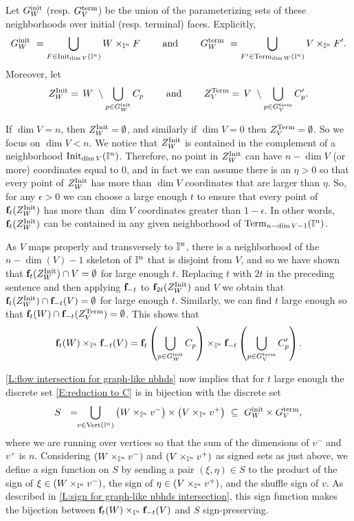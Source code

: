 Let $G^{\mathrm{init}}_W$ (resp. $G^{\mathrm{term}}_V$) be the union of the parameterizing sets of these neighborhoods over initial (resp. terminal) faces.
Explicitly,
\[
G^{\mathrm{init}}_W\ =
\bigcup_{F \in {\rm Init}_{\dim V}(\mathbb{I}^n)} W \times_{\mathbb{I}^n} F
\qquad \text{ and } \qquad
G^{\mathrm{term}}_W\ =
\bigcup_{F^\prime \in {\rm Term}_{\dim W}(\mathbb{I}^n)} V \times_{\mathbb{I}^n} F^\prime.
\]
Moreover, let
\[
Z_W^{\rm Init} =\, W\ \setminus \bigcup_{p \in G^{\mathrm{init}}_W} C_p
\qquad \text{ and } \qquad
Z_V^{\rm Term} =\, V\ \setminus \bigcup_{p \in G^{\mathrm{term}}_V} C_p^\prime.
\]

If $\dim V=n$, then $Z_W^{\rm Init}=\emptyset$, and similarly if $\dim V=0$ then $Z_V^{\rm Term}=\emptyset$.
So we focus on $\dim V<n$.
We notice that $Z_W^{\rm Init}$ is contained in the complement of a neighborhood ${\rm Init}_{\dim V}(\mathbb{I}^n)$.
Therefore, no point in $Z_W^{\rm Init}$ can have $n-\dim V$ (or more) coordinates equal to $0$, and in fact we can assume there is an $\eta>0$
so that every point of $Z_W^{\rm Init}$ has more than $\dim V$ coordinates that are larger than $\eta$.
So, for any $\epsilon>0$ we can choose a large enough $t$ to ensure that every point of $\mathbf{f}_t(Z_W^{\rm Init})$ has more than $\dim V$ coordinates greater than
$1-\epsilon$.
In other words, $\mathbf{f}_t(Z_W^{\rm Init})$ can be contained in any given neighborhood of ${\rm Term}_{n-\dim V-1}(\mathbb{I}^n)$.

As $V$ maps properly and transversely to $\mathbb{I}^n$, there is a neighborhood of the $n-\dim(V)-1$ skeleton of $\mathbb{I}^n$ that is disjoint from $V$, and so we have shown that $\mathbf{f}_t(Z_W^{\rm Init}) \cap V = \emptyset$ for large enough $t$.
Replacing $t$ with $2t$ in the preceding sentence and then applying $\mathbf{f}_{-t}$ to $\mathbf{f}_{2t}(Z_W^{\rm Init})$ and $V$ we obtain that $\mathbf{f}_t(Z_W^{\rm Init}) \cap \mathbf{f}_{-t}(V) = \emptyset$ for large enough $t$.
Similarly, we can find $t$ large enough so that $\mathbf{f}_{t}(W) \cap \mathbf{f}_{-t}(Z_V^{\rm Term}) = \emptyset$.
This shows that
\begin{equation}\label{E:reduction to C}
	\mathbf{f}_t(W) \times_{\mathbb{I}^n} \mathbf{f}_{-t}(V) = \mathbf{f}_t \left( \bigcup_{p \in G^{\mathrm{init}}_W} C_p \right) \times_{\mathbb{I}^n} \mathbf{f}_{-t} \left( \bigcup_{p \in G^{\mathrm{term}}_V} C_p^\prime \right).
\end{equation}

\cref{L:flow intersection for graph-like nbhds} now implies that for $t$ large enough the discrete set \eqref{E:reduction to C} is in bijection with the discrete set
\[
S\ \ =\!\! \bigcup_{v \in {\rm Vert}(\mathbb{I}^n)} \left(W \times_{\mathbb{I}^n} v^-\right) \times \left(V \times_{\mathbb{I}^n} v^+\right) \ \subseteq\ G^{\mathrm{init}}_W \times G^{\mathrm{term}}_V,
\]
where we are running over vertices so that the sum of the dimensions of $v^-$ and $v^+$ is $n$.
Considering $\left(W \times_{\mathbb{I}^n} v^-\right)$ and $\left(V \times_{\mathbb{I}^n} v^+\right)$ as signed sets as just above, we define a sign function on $S$ by sending a pair $(\xi, \eta) \in S$ to the product of the sign of $\xi \in \left(W \times_{\mathbb{I}^n} v^-\right)$, the sign of $\eta \in \left(V \times_{\mathbb{I}^n} v^+\right)$, and the shuffle sign of $v$.
As described in \cref{L:sign for graph-like nbhds intersection}, this sign function makes the bijection between $\mathbf{f}_t(W) \times_{\mathbb{I}^n} \mathbf{f}_{-t}(V)$ and $S$ sign-preserving.

